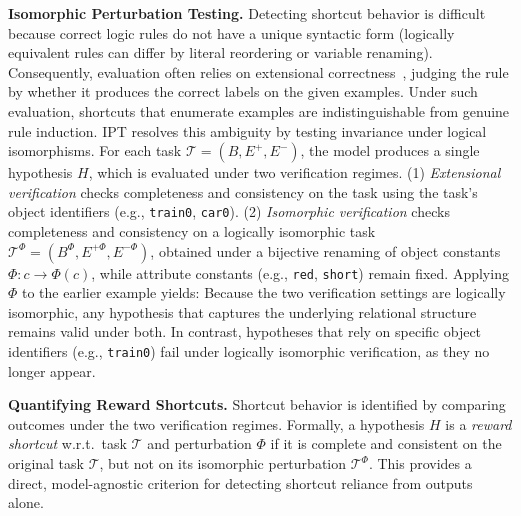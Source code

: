 \documentclass{article}
\newcommand{\symbols}[1]{\texttt{\small{#1}}}
\begin{document}
\textbf{Isomorphic Perturbation Testing.}
Detecting shortcut behavior is difficult because correct logic rules do not have a unique syntactic form (logically equivalent rules can differ by literal reordering or variable renaming). Consequently, evaluation often relies on extensional correctness~\cite{Cropper2021InductiveLP}, judging the rule by whether it produces the correct labels on the given examples. Under such evaluation, shortcuts that enumerate examples are indistinguishable from genuine rule induction. IPT resolves this ambiguity by testing invariance under logical isomorphisms.
%
For each task $\mathcal{T} = (B, E^+, E^-)$, the model produces a single hypothesis $H$, which is evaluated under two verification regimes. (1) \textit{Extensional verification} checks completeness and consistency on the task using the task's object identifiers (e.g., \symbols{train0}, \symbols{car0}). (2) \textit{Isomorphic verification} checks completeness and consistency on a logically isomorphic task $\mathcal{T}^\Phi = (B^\Phi, E^{+\Phi}, E^{-\Phi})$, obtained under a bijective renaming of object constants $\Phi: c \to \Phi(c)$, while attribute constants (e.g., \symbols{red}, \symbols{short}) remain fixed. Applying $\Phi$ to the earlier example yields:
Because the two verification settings are logically isomorphic, any hypothesis that captures the underlying relational structure remains valid under both. In contrast, hypotheses that rely on specific object identifiers (e.g., \symbols{train0}) fail under logically isomorphic verification, as they no longer appear.


\textbf{Quantifying Reward Shortcuts.} Shortcut behavior is identified by comparing outcomes under the two verification regimes. Formally, a hypothesis $H$ is a \textit{reward shortcut} w.r.t.\ task $\mathcal{T}$ and perturbation $\Phi$ if it is complete and consistent on the original task $\mathcal{T}$, but not on its isomorphic perturbation $\mathcal{T}^\Phi$.  This provides a direct, model-agnostic criterion for detecting shortcut reliance from outputs alone.
\end{document}
